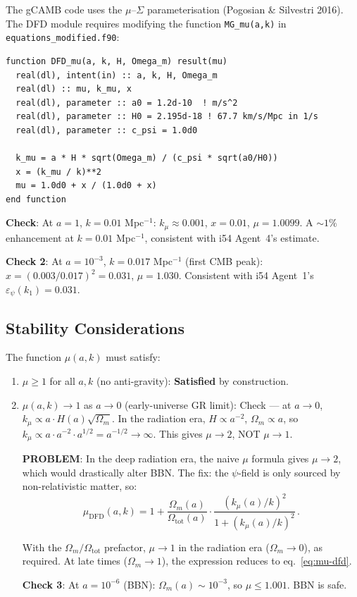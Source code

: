 \documentclass[11pt,a4paper]{article}
\begin{document}
The gCAMB code uses the $\mu$--$\Sigma$ parameterisation (Pogosian \& Silvestri 2016). The DFD module requires modifying the function \texttt{MG\_mu(a,k)} in \texttt{equations\_modified.f90}:

\begin{verbatim}
function DFD_mu(a, k, H, Omega_m) result(mu)
  real(dl), intent(in) :: a, k, H, Omega_m
  real(dl) :: mu, k_mu, x
  real(dl), parameter :: a0 = 1.2d-10  ! m/s^2
  real(dl), parameter :: H0 = 2.195d-18 ! 67.7 km/s/Mpc in 1/s
  real(dl), parameter :: c_psi = 1.0d0

  k_mu = a * H * sqrt(Omega_m) / (c_psi * sqrt(a0/H0))
  x = (k_mu / k)**2
  mu = 1.0d0 + x / (1.0d0 + x)
end function
\end{verbatim}

\textbf{Check}: At $a = 1$, $k = 0.01$ Mpc$^{-1}$: $k_\mu \approx 0.001$, $x = 0.01$, $\mu = 1.0099$. A $\sim 1\%$ enhancement at $k = 0.01$ Mpc$^{-1}$, consistent with i54 Agent~4's estimate.

\textbf{Check 2}: At $a = 10^{-3}$, $k = 0.017$ Mpc$^{-1}$ (first CMB peak): $x = (0.003/0.017)^2 = 0.031$, $\mu = 1.030$. Consistent with i54 Agent~1's $\varepsilon_\psi(k_1) = 0.031$.

\subsection{Stability Considerations}

The function $\mu(a,k)$ must satisfy:
\begin{enumerate}
\item $\mu \geq 1$ for all $a, k$ (no anti-gravity): \textbf{Satisfied} by construction.
\item $\mu(a,k) \to 1$ as $a \to 0$ (early-universe GR limit): Check --- at $a \to 0$, $k_\mu \propto a \cdot H(a)\sqrt{\Omega_m}$. In the radiation era, $H \propto a^{-2}$, $\Omega_m \propto a$, so $k_\mu \propto a \cdot a^{-2} \cdot a^{1/2} = a^{-1/2} \to \infty$. This gives $\mu \to 2$, NOT $\mu \to 1$.

\textbf{PROBLEM}: In the deep radiation era, the naive $\mu$ formula gives $\mu \to 2$, which would drastically alter BBN. The fix: the $\psi$-field is only sourced by non-relativistic matter, so:
\begin{equation}
\mu_{\mathrm{DFD}}(a,k) = 1 + \frac{\Omega_m(a)}{\Omega_{\mathrm{tot}}(a)} \cdot \frac{(k_\mu(a)/k)^2}{1 + (k_\mu(a)/k)^2}\,.
\end{equation}

With the $\Omega_m/\Omega_{\mathrm{tot}}$ prefactor, $\mu \to 1$ in the radiation era ($\Omega_m \to 0$), as required. At late times ($\Omega_m \to 1$), the expression reduces to eq.~\eqref{eq:mu-dfd}.

\textbf{Check 3}: At $a = 10^{-6}$ (BBN): $\Omega_m(a) \sim 10^{-3}$, so $\mu \leq 1.001$. BBN is safe.
\end{enumerate}
\end{document}
